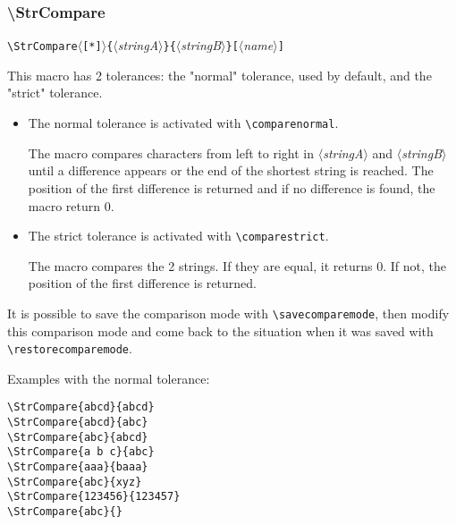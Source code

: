 \documentclass[a4paper,10pt]{article}
\newcommand\argu[1]{$\langle$\textit{#1}$\rangle$}
\newcommand\ARGU[1]{\texttt{\{}\argu{#1}\texttt{\}}}
\newcommand\arguC[1]{\texttt{[}\argu{#1}\texttt{]}}
\newcommand\etoile{$\langle$\texttt{[*]}$\rangle$}
\newcommand\styleexemple{\small\vskip4pt}
\newcommand\verbinline{\lstinline[basicstyle=\normalsize\ttfamily]}
\begin{document}
\subsubsection{\ttfamily\textbackslash StrCompare}
\verbinline|\StrCompare|\etoile\ARGU{stringA}\ARGU{stringB}\arguC{name}
\smallskip

This macro has 2 tolerances: the "normal" tolerance, used by default, and the "strict" tolerance.
\begin{itemize}
	\item The normal tolerance is activated with \verbinline|\comparenormal|.\par
	The macro compares characters from left to right in \argu{stringA} and \argu{stringB} until a difference appears or the end of the shortest string is reached. The position of the first difference is returned and if no difference is found, the macro return 0.
	\item The strict tolerance is activated with \verbinline|\comparestrict|.\par
	The macro compares the 2 strings. If they are equal, it returns 0. If not, the position of the first difference is returned.
\end{itemize}
\medskip

It is possible to save the comparison mode with \verbinline|\savecomparemode|, then modify this comparison mode and come back to the situation when it was saved with \verbinline|\restorecomparemode|.\medskip

Examples with the normal tolerance:\par\nobreak
\begin{minipage}[t]{0.65\linewidth}
\comparenormal
\begin{lstlisting}
\StrCompare{abcd}{abcd}
\StrCompare{abcd}{abc}
\StrCompare{abc}{abcd}
\StrCompare{a b c}{abc}
\StrCompare{aaa}{baaa}
\StrCompare{abc}{xyz}
\StrCompare{123456}{123457}
\StrCompare{abc}{}
\end{lstlisting}%
\end{minipage}\hfill
\begin{minipage}[t]{0.35\linewidth}
	\styleexemple
	\comparenormal
	\par
	\par
	\par
	\par
	\par
	\par
	\par
\end{minipage}%
\medskip
\end{document}
